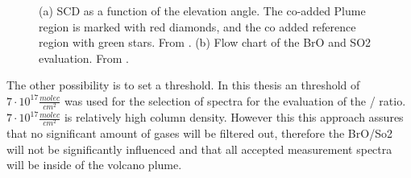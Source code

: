 \documentclass  [
  paper    = a4,
  BCOR     = 10mm,
  twoside,
  fontsize = 12pt,
  fleqn,
  toc      = bibnumbered,
  toc      = listofnumbered,
  numbers  = noendperiod,
  headings = normal,
  listof   = leveldown,
  version  = 3.03
]                                       {scrreprt}
\begin{document}
	\begin{figure}
		\caption{(a)  SCD as a function of the elevation angle. The co-added Plume region is marked with red diamonds, and the co added reference region with green stars. From \cite{WarnachSimon}. (b) Flow chart of the BrO and SO2 evaluation. From \cite{lubcke2014optical}.}
		\label{fig:algorithm}
	\end{figure}
	The other possibility is to set a  threshold. In this thesis an  threshold of $7\cdot 10^{17} \frac{molec}{cm^2}$ was used for the selection of spectra for the evaluation of the / ratio. $7\cdot 10^{17} \frac{molec}{cm^2}$ is relatively high column density. However this this approach assures that no significant amount of gases will be filtered out, therefore the BrO/So2 will not be significantly influenced \citealp{lubcke2014bro} and that all accepted measurement spectra will be inside of the volcano plume. 
	
\end{document}
